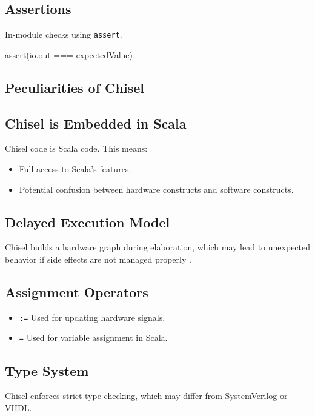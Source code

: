 \subsection{Assertions}
In-module checks using \texttt{assert}.
\begin{chiselcode}
assert(io.out === expectedValue)
\end{chiselcode}

\subsection{Peculiarities of Chisel}
\subsection{Chisel is Embedded in Scala}
Chisel code is Scala code. This means:

\begin{itemize}
    \item Full access to Scala's features.
    \item Potential confusion between hardware constructs and software constructs.
\end{itemize}

\subsection{Delayed Execution Model}
Chisel builds a hardware graph during elaboration, which may lead to unexpected behavior if side effects are not managed properly \cite{chisel-doc}.

\subsection{Assignment Operators}
\begin{itemize}
    \item \texttt{:=} Used for updating hardware signals.
    \item \texttt{=} Used for variable assignment in Scala.
\end{itemize}

\subsection{Type System}
Chisel enforces strict type checking, which may differ from SystemVerilog or VHDL.

